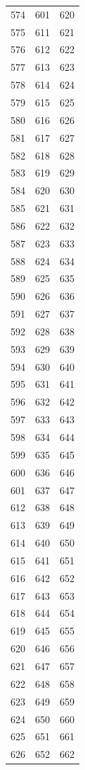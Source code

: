 \begin{tabular}{rrr}
  574 & 601 & 620 \\
  575 & 611 & 621 \\
  576 & 612 & 622 \\
  577 & 613 & 623 \\
  578 & 614 & 624 \\
  579 & 615 & 625 \\
  580 & 616 & 626 \\
  581 & 617 & 627 \\
  582 & 618 & 628 \\
  583 & 619 & 629 \\
  584 & 620 & 630 \\
  585 & 621 & 631 \\
  586 & 622 & 632 \\
  587 & 623 & 633 \\
  588 & 624 & 634 \\
  589 & 625 & 635 \\
  590 & 626 & 636 \\
  591 & 627 & 637 \\
  592 & 628 & 638 \\
  593 & 629 & 639 \\
  594 & 630 & 640 \\
  595 & 631 & 641 \\
  596 & 632 & 642 \\
  597 & 633 & 643 \\
  598 & 634 & 644 \\
  599 & 635 & 645 \\
  600 & 636 & 646 \\
  601 & 637 & 647 \\
  612 & 638 & 648 \\
  613 & 639 & 649 \\
  614 & 640 & 650 \\
  615 & 641 & 651 \\
  616 & 642 & 652 \\
  617 & 643 & 653 \\
  618 & 644 & 654 \\
  619 & 645 & 655 \\
  620 & 646 & 656 \\
  621 & 647 & 657 \\
  622 & 648 & 658 \\
  623 & 649 & 659 \\
  624 & 650 & 660 \\
  625 & 651 & 661 \\
  626 & 652 & 662 \\

\end{tabular}
